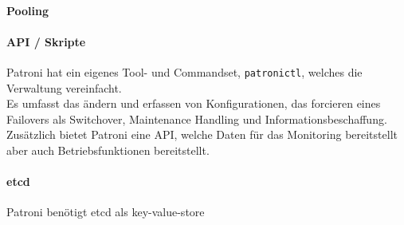 \begin{flushleft}
    \paragraph{Pooling}

\end{flushleft}
\begin{flushleft}
    \paragraph{API / Skripte}
    Patroni hat ein eigenes Tool- und Commandset, \texttt{patronictl}, welches die Verwaltung vereinfacht.\\
    Es umfasst das ändern und erfassen von Konfigurationen, das forcieren eines Failovers als Switchover, Maintenance Handling und Informationsbeschaffung.\\

    Zusätzlich bietet Patroni eine API, welche Daten für das Monitoring bereitstellt aber auch Betriebsfunktionen bereitstellt.\\
\end{flushleft}
\begin{flushleft}
    \paragraph{\gls{etcd}}
    Patroni benötigt etcd als key-value-store
\end{flushleft}
